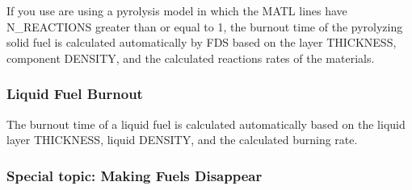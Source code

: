 \documentclass[11pt]{book}
\begin{document}
If you use are using a pyrolysis model in which the {\ct MATL} lines have {\ct N\_REACTIONS} greater than or equal to 1, the burnout time of the pyrolyzing solid fuel is calculated automatically by FDS based on the layer {\ct THICKNESS}, component {\ct DENSITY}, and the calculated reactions rates of the materials.


\subsubsection{Liquid Fuel Burnout}

The burnout time of a liquid fuel is calculated automatically based on the liquid layer {\ct THICKNESS}, liquid {\ct DENSITY}, and the calculated burning rate.


\subsubsection{Special topic: Making Fuels Disappear}
\label{info:BURN_AWAY}
\label{box_burn_away1}
\label{box_burn_away2}
\label{box_burn_away3}
\label{box_burn_away4}
\label{box_burn_away_2D}
\label{box_burn_away_2D_residue}
\end{document}

